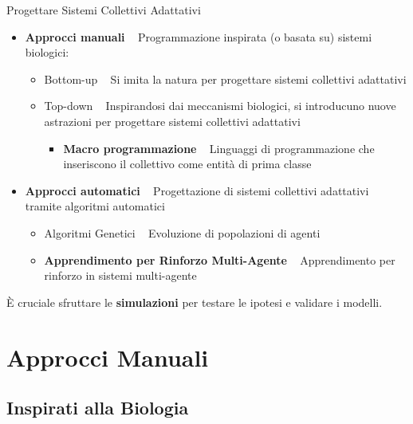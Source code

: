 \documentclass[presentation, 10pt,aspectratio=169]{beamer}\mode<presentation>{\usetheme{AMSBolognaFC}}
\begin{document}
\begin{frame}{Progettare Sistemi Collettivi Adattativi}
	\begin{itemize}
		\item \textbf{Approcci manuali} \faArrowRight ~ Programmazione inspirata (o basata su) sistemi biologici:
		\begin{itemize}
			\item \alert{Bottom-up} \faArrowRight ~ Si imita la natura per progettare sistemi collettivi adattativi
			\item \alert{Top-down} \faArrowRight ~ Inspirandosi dai meccanismi biologici, si introducuno nuove astrazioni per progettare sistemi collettivi adattativi
			\begin{itemize}
				\item \textbf{Macro programmazione} \faArrowRight ~ Linguaggi di programmazione che inseriscono il collettivo come entità di prima classe
			\end{itemize}
		\end{itemize}
		\item \textbf{Approcci automatici} \faArrowRight ~ Progettazione di sistemi collettivi adattativi tramite algoritmi automatici
		\begin{itemize}
			\item \alert{Algoritmi Genetici} \faArrowRight ~ Evoluzione di popolazioni di agenti
			\item \textbf{Apprendimento per Rinforzo Multi-Agente} \faArrowRight ~ Apprendimento per rinforzo in sistemi multi-agente
		\end{itemize}
	\end{itemize}

	È cruciale sfruttare le \alert{\textbf{simulazioni}} per testare le ipotesi e validare i modelli.
\end{frame}
\section{Approcci Manuali}

\subsection{Inspirati alla Biologia}
\end{document}
